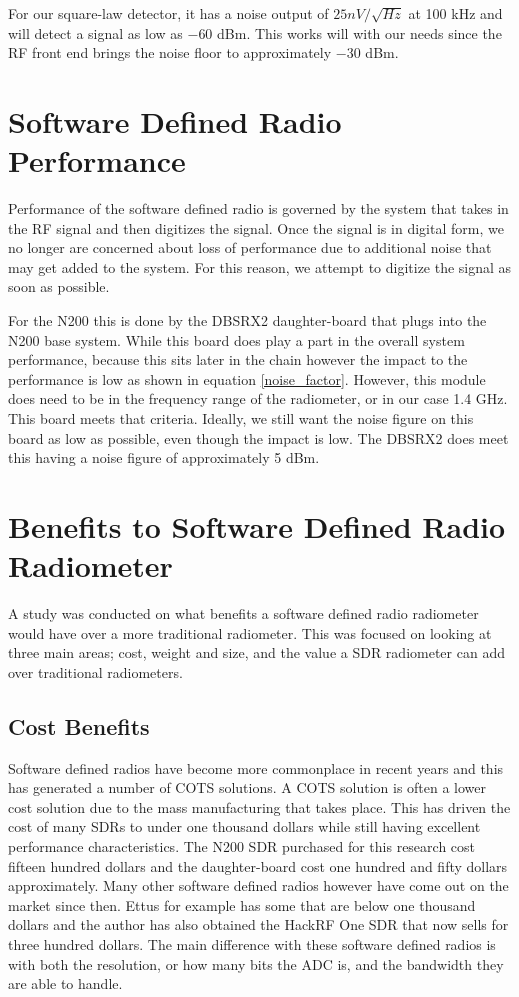 For our square-law detector, it has a noise output of $25nV/ \sqrt{Hz}$ at 100 kHz and will detect a signal as low as $-60$ dBm.  This works will with our needs since the RF front end brings the noise floor to approximately $-30$ dBm.


\section{Software Defined Radio Performance}
Performance of the software defined radio is governed by the system that takes in the RF signal and then digitizes the signal.  Once the signal is in digital form, we no longer are concerned about loss of performance due to additional noise that may get added to the system.  For this reason, we attempt to digitize the signal as soon as possible.

For the N200 this is done by the DBSRX2 daughter-board that plugs into the N200 base system.  While this board does play a part in the overall system performance, because this sits later in the chain however the impact to the performance is low as shown in equation \ref{noise_factor}.  However, this module does need to be in the frequency range of the radiometer, or in our case 1.4 GHz.  This board meets that criteria.  Ideally, we still want the noise figure on this board as low as possible, even though the impact is low.  The DBSRX2 does meet this having a noise figure of approximately 5 dBm.
\section{Benefits to Software Defined Radio Radiometer}
A study was conducted on what benefits a software defined radio radiometer would have over a more traditional radiometer.  This was focused on looking at three main areas; cost, weight and size, and the value a SDR radiometer can add over traditional radiometers.

\subsection{Cost Benefits}
Software defined radios have become more commonplace in recent years and this has generated a number of COTS solutions.  A COTS solution is often a lower cost solution due to the mass manufacturing that takes place.  This has driven the cost of many SDRs to under one thousand dollars while still having excellent performance characteristics.  The N200 SDR purchased for this research cost fifteen hundred dollars and the daughter-board cost one hundred and fifty dollars approximately.  Many other software defined radios however have come out on the market since then.  Ettus for example has some that are below one thousand dollars and the author has also obtained the HackRF One SDR that now sells for three hundred dollars.  The main difference with these software defined radios is with both the resolution, or how many bits the ADC is, and the bandwidth they are able to handle.

